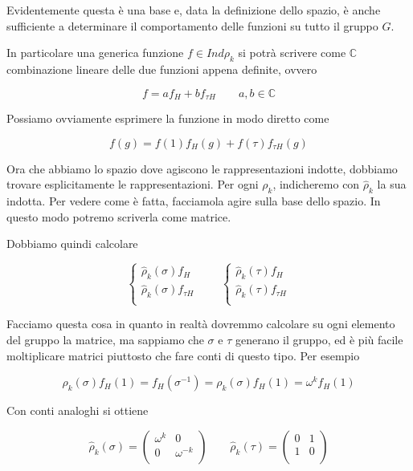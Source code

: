 \documentclass[11pt]{article}
\theoremstyle{plain}
\theoremstyle{definition}
\theoremstyle{remark}
\newcommand{\C}{\mathbb{C}}
\begin{document}
Evidentemente questa è una base e, data la definizione dello spazio, è anche sufficiente a determinare il comportamento delle funzioni su tutto il gruppo $G$.

In particolare una generica funzione $f \in Ind \rho_k$ si potrà scrivere come $\C$ combinazione lineare delle due funzioni appena definite, ovvero

\[ f = a f_H + b f_{\tau H} \qquad a,b \in \C\]


Possiamo ovviamente esprimere la funzione in modo diretto come

\[ f(g) = f(1) f_H(g) + f(\tau) f_{\tau H} (g) \]

Ora che abbiamo lo spazio dove agiscono le rappresentazioni indotte, dobbiamo trovare esplicitamente le rappresentazioni. Per ogni $\rho_k$, indicheremo con $\hat \rho_k$ la sua indotta. Per vedere come è fatta, facciamola agire sulla base dello spazio. In questo modo potremo scriverla come matrice.

Dobbiamo quindi calcolare

\[ 
\begin{cases}
\hat \rho_k (\sigma) f_H \\ 
\hat \rho_k (\sigma) f_{\tau H} \\
\end{cases}
\qquad
\begin{cases}
\hat \rho_k (\tau) f_H \\
\hat \rho_k (\tau) f_{\tau H}\\
\end{cases}
\]

Facciamo questa cosa in quanto in realtà dovremmo calcolare su ogni elemento del gruppo la matrice, ma sappiamo che $\sigma$ e $\tau$ generano il gruppo, ed è più facile moltiplicare matrici piuttosto che fare conti di questo tipo.  Per esempio


\[ 
\hat \rho_k (\sigma) f_H(1) = f_H(\sigma^{-1}) = \rho_k(\sigma) f_H(1) = \omega^k f_H(1)
\]

Con conti analoghi si ottiene


\[ 
\hat \rho_k (\sigma) = 
\left(
\begin{array}{cc}
\omega^k & 0 \\
0 & \omega^{-k} \\
\end{array}
\right)
\qquad
\hat \rho_k (\tau) = 
\left(
\begin{array}{cc}
0 & 1 \\
1 & 0 \\
\end{array}
\right)
\]
\end{document}
